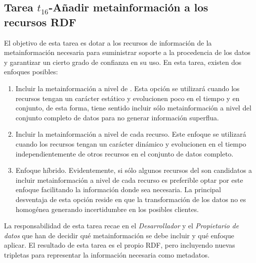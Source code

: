 \subsection{Tarea $t_{16}$-Añadir metainformación a los recursos RDF}\label{t16-metodos}
El objetivo de esta tarea es dotar a los recursos de información de la metainformación 
necesaria para suministrar soporte a la procedencia de los datos y garantizar 
un cierto grado de confianza en su uso. En esta tarea, existen dos enfoques 
posibles:
\begin{enumerate}
 \item Incluir la metainformación a nivel de \dataset. Esta opción se utilizará cuando 
los recursos tengan un carácter estático y evolucionen poco en el tiempo y en conjunto, de esta forma, 
tiene sentido incluir sólo metainformación a nivel del conjunto completo de datos para no generar 
información superflua.
 \item Incluir la metainformación a nivel de cada recurso. Este enfoque se utilizará cuando 
los recursos tengan un carácter dinámico y evolucionen en el tiempo independientemente de otros 
recursos en el conjunto de datos completo. 
 \item Enfoque híbrido. Evidentemente, si sólo algunos recursos del \dataset son candidatos 
a incluir metainformación a nivel de cada recurso es preferible optar por este enfoque facilitando 
la información donde sea necesaria. La principal desventaja de esta opción reside en que la transformación 
de los datos no es homogénea generando incertidumbre en los posibles clientes. 
\end{enumerate}

La responsabilidad de esta tarea recae en el \textit{Desarrollador} y el \textit{Propietario de datos} que han de decidir 
qué metainformación se debe incluir y qué enfoque aplicar. El resultado de esta tarea es el propio 
\dataset \gls{RDF}, pero incluyendo nuevas tripletas para representar la información necesaria como 
metadatos.

